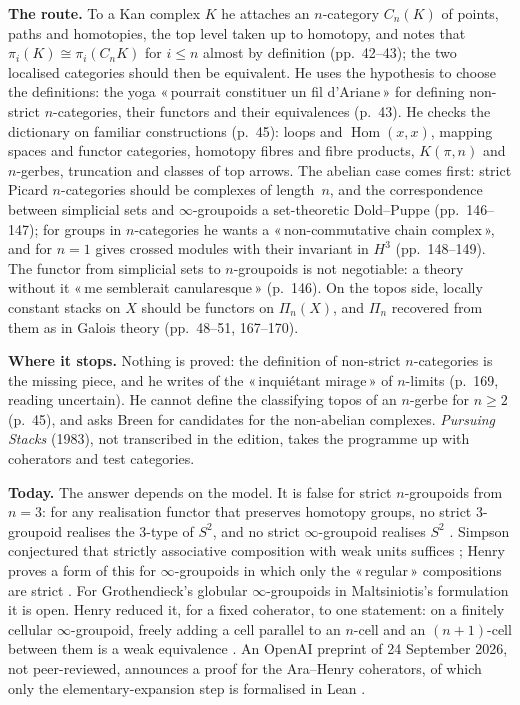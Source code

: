 \documentclass[11pt]{article}
\newcommand{\q}[1]{«\,#1\,»}
\theoremstyle{definition}
\theoremstyle{plain}\newtheorem*{proposition}{Proposition}\theoremstyle{definition}
\newcommand{\entry}[1]{\par\medskip\noindent\textbf{#1}\enspace}
\begin{document}
\entry{The route.} To a Kan complex $K$ he attaches an $n$-category $C_n(K)$ of points, paths and homotopies, the top level taken up to homotopy, and notes that $\pi_i(K) \cong \pi_i(C_n K)$ for $i \le n$ almost by definition (pp.~42--43); the two localised categories should then be equivalent. He uses the hypothesis to choose the definitions: the yoga \q{pourrait constituer un fil d'Ariane} for defining non-strict $n$-categories, their functors and their equivalences (p.~43). He checks the dictionary on familiar constructions (p.~45): loops and $\operatorname{Hom}(x,x)$, mapping spaces and functor categories, homotopy fibres and fibre products, $K(\pi, n)$ and $n$-gerbes, truncation and classes of top arrows. The abelian case comes first: strict Picard $n$-categories should be complexes of length~$n$, and the correspondence between simplicial sets and $\infty$-groupoids a set-theoretic Dold--Puppe (pp.~146--147); for groups in $n$-categories he wants a \q{non-commutative chain complex}, and for $n = 1$ gives crossed modules with their invariant in $H^3$ (pp.~148--149). The functor from simplicial sets to $n$-groupoids is not negotiable: a theory without it \q{me semblerait canularesque} (p.~146). On the topos side, locally constant stacks on $X$ should be functors on $\Pi_n(X)$, and $\Pi_n$ recovered from them as in Galois theory (pp.~48--51, 167--170).

\entry{Where it stops.} Nothing is proved: the definition of non-strict $n$-categories is the missing piece, and he writes of the \q{inquiétant mirage} of $n$-limits (p.~169, reading uncertain). He cannot define the classifying topos of an $n$-gerbe for $n \ge 2$ (p.~45), and asks Breen for candidates for the non-abelian complexes. \emph{Pursuing Stacks} (1983), not transcribed in the edition, takes the programme up with coherators and test categories.

\entry{Today.} The answer depends on the model. It is false for strict $n$-groupoids from $n = 3$: for any realisation functor that preserves homotopy groups, no strict $3$-groupoid realises the $3$-type of $S^2$, and no strict $\infty$-groupoid realises $S^2$ \cite[Prop.~5.1, Cor.~6.1]{simpson1998}. Simpson conjectured that strictly associative composition with weak units suffices \cite[\S7, Conj.~1]{simpson1998}; Henry proves a form of this for $\infty$-groupoids in which only the \q{regular} compositions are strict \cite[\S\S6.1--6.3]{henry2018}. For Grothendieck's globular $\infty$-groupoids in Maltsiniotis's formulation it is open. Henry reduced it, for a fixed coherator, to one statement: on a finitely cellular $\infty$-groupoid, freely adding a cell parallel to an $n$-cell and an $(n+1)$-cell between them is a weak equivalence \cite[Conj.~5.3.3, Cor.~5.3.13]{henry2016}. An OpenAI preprint of 24 September 2026, not peer-reviewed, announces a proof for the Ara--Henry coherators, of which only the elementary-expansion step is formalised in Lean \cite{openaimath}.
\end{document}
